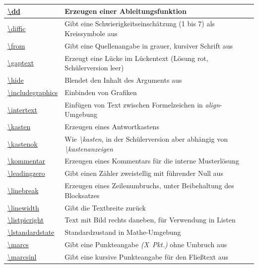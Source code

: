 \documentclass[../main.tex]{subfiles}
\begin{document}
\begin{tabularx}{\linewidth}{|l|X|}
    \hyperlink{dd}{\textbackslash{}dd}&Erzeugen einer Ableitungsfunktion\\\hline
    \hyperlink{diffic}{\textbackslash{}diffic}&Gibt eine Schwierigkeitseinsch\"atzung (1 bis 7) als Kreissymbole aus\\\hline
    \hyperlink{from}{\textbackslash{}from}&Gibt eine Quellenangabe in grauer, kursiver Schrift aus\\\hline
    \hyperlink{gaptext}{\textbackslash{}gaptext}&Erzeugt eine L\"ucke im L\"uckentext (L\"osung rot, Sch\"ulerversion leer)\\\hline
    \hyperlink{hide}{\textbackslash{}hide}&Blendet den Inhalt des Arguments aus\\\hline
    \hyperlink{includegraphics}{\textbackslash{}includegraphics}&Einbinden von Grafiken\\\hline
    \hyperlink{intertext}{\textbackslash{}intertext}&Einf\"ugen von Text zwischen Formelzeichen in \textit{align}-Umgebung\\\hline
    \hyperlink{kasten}{\textbackslash{}kasten}&Erzeugen eines Antwortkastens\\\hline
    \hyperlink{kastenok}{\textbackslash{}kastenok}&Wie \textit{\textbackslash kasten}, in der Sch\"ulerversion aber abh\"angig von \textit{\textbackslash kastenanzeigen}\\\hline
    \hyperlink{kommentar}{\textbackslash{}kommentar}&Erzeugen eines Kommentars f\"ur die interne Musterl\"osung\\\hline
    \hyperlink{leadingzero}{\textbackslash{}leadingzero}&Gibt einen Z\"ahler zweistellig mit f\"uhrender Null aus\\\hline
    \hyperlink{linebreak}{\textbackslash{}linebreak}&Erzeugen eines Zeilenumbruchs, unter Beibehaltung des Blocksatzes\\\hline
    \hyperlink{linewidth}{\textbackslash{}linewidth}&Gibt die Textbreite zur\"uck\\\hline
    \hyperlink{listpicright}{\textbackslash{}listpicright}&Text mit Bild rechts daneben, f\"ur Verwendung in Listen\\\hline
    \hyperlink{lstandardstate}{\textbackslash{}lstandardstate}&Standardzustand in Mathe-Umgebung\\\hline
    \hyperlink{marcs}{\textbackslash{}marcs}&Gibt eine Punkteangabe \textit{(X~Pkt.)} ohne Umbruch aus\\\hline
    \hyperlink{marcsinl}{\textbackslash{}marcsinl}&Gibt eine kursive Punkteangabe f\"ur den Flie\ss{}text aus\\\hline

\end{tabularx}
\end{document}
